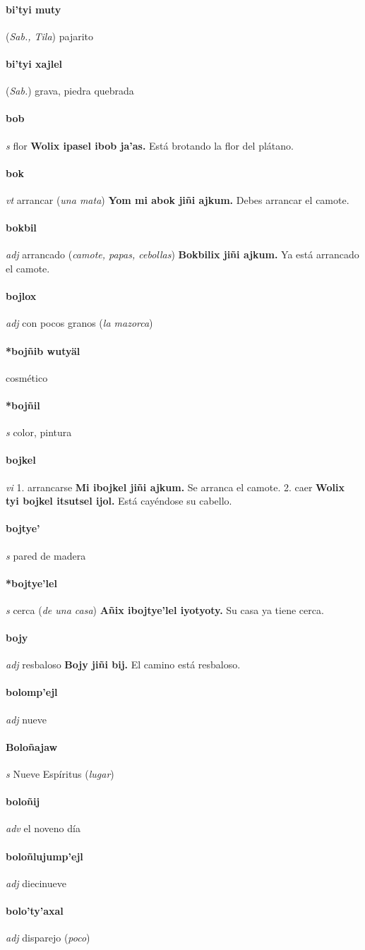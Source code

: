\documentclass{scrbook}
\newcommand{\entry}[1]{\paragraph{#1}}
\newcommand{\onedefinition}[1]{#1.}
\newcommand{\partofspeech}[1]{\textit{#1}}
\newcommand{\spanishtranslation}[1]{#1}
\newcommand{\clarification}[1]{(\textit{#1})}
\newcommand{\cholexample}[1]{\textbf{#1}}
\newcommand{\exampletranslation}[1]{#1}
\newcommand{\relevantdialect}[1]{(\textit{#1})}
\begin{document}
\begin{multicols}{2}
\entry{bi'tyi muty}
\relevantdialect{Sab., Tila}
\spanishtranslation{pajarito}

\entry{bi'tyi xajlel}
\relevantdialect{Sab.}
\spanishtranslation{grava, piedra quebrada}

\entry{bob}
\partofspeech{s}
\spanishtranslation{flor}
\cholexample{Wolix ipasel ibob ja'as.}
\exampletranslation{Está brotando la flor del plátano.}

\entry{bok}
\partofspeech{vt}
\spanishtranslation{arrancar}
\clarification{una mata}
\cholexample{Yom mi abok jiñi ajkum.}
\exampletranslation{Debes arrancar el camote.}

\entry{bokbil}
\partofspeech{adj}
\spanishtranslation{arrancado}
\clarification{camote, papas, cebollas}
\cholexample{Bokbilix jiñi ajkum.}
\exampletranslation{Ya está arrancado el camote.}

\entry{bojlox}
\partofspeech{adj}
\spanishtranslation{con pocos granos}
\clarification{la mazorca}

\entry{*bojñib wutyäl}
\spanishtranslation{cosmético}

\entry{*bojñil}
\partofspeech{s}
\spanishtranslation{color, pintura}

\entry{bojkel}
\partofspeech{vi}
\onedefinition{1}
\spanishtranslation{arrancarse}
\cholexample{Mi ibojkel jiñi ajkum.}
\exampletranslation{Se arranca el camote.}
\onedefinition{2}
\spanishtranslation{caer}
\cholexample{Wolix tyi bojkel itsutsel ijol.}
\exampletranslation{Está cayéndose su cabello.}

\entry{bojtye'}
\partofspeech{s}
\spanishtranslation{pared de madera}

\entry{*bojtye'lel}
\partofspeech{s}
\spanishtranslation{cerca}
\clarification{de una casa}
\cholexample{Añix ibojtye'lel iyotyoty.}
\exampletranslation{Su casa ya tiene cerca.}

\entry{bojy}
\partofspeech{adj}
\spanishtranslation{resbaloso}
\cholexample{Bojy jiñi bij.}
\exampletranslation{El camino está resbaloso.}

\entry{bolomp'ejl}
\partofspeech{adj}
\spanishtranslation{nueve}

\entry{Boloñajaw}
\partofspeech{s}
\spanishtranslation{Nueve Espíritus}
\clarification{lugar}

\entry{boloñij}
\partofspeech{adv}
\spanishtranslation{el noveno día}

\entry{boloñlujump'ejl}
\partofspeech{adj}
\spanishtranslation{diecinueve}

\entry{bolo'ty'axal}
\partofspeech{adj}
\spanishtranslation{disparejo}
\clarification{poco}


\end{multicols}
\end{document}
